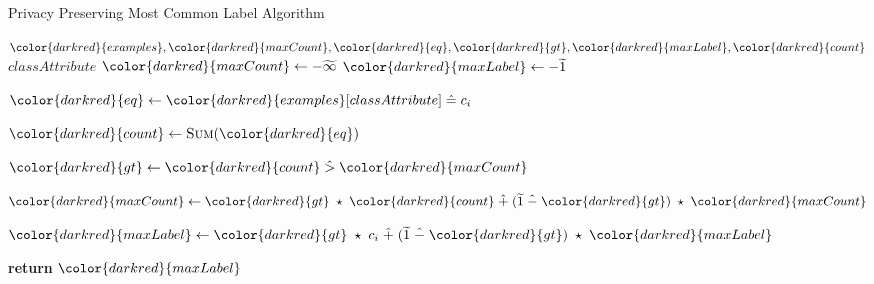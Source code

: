 \begin{algorithm}[H]
\caption{Privacy Preserving Most Common Label Algorithm}\label{a:id3-most-common-label-pp}
\begin{algorithmic}[1]
\renewcommand{\algorithmicrequire}{\textbf{Private Vars:}}
\Require ${\color{darkred}{examples}}, {\color{darkred}{maxCount}}, {\color{darkred}{eq}}, {\color{darkred}{gt}}, {\color{darkred}{maxLabel}}, {\color{darkred}{count}}$
\renewcommand{\algorithmicrequire}{\textbf{Global Vars:}}
\Require $classAttribute$
  \State ${\color{darkred}{maxCount}} \gets -\enc{\infty}$
  \State ${\color{darkred}{maxLabel}} \gets -\enc{1}$


      \State ${\color{darkred}{eq}} \gets {\color{darkred}{examples}}[classAttribute] \heq c_i$ 

      \State ${\color{darkred}{count}} \gets \textsc{Sum}({\color{darkred}{eq}})$

      \State ${\color{darkred}{gt}} \gets {\color{darkred}{count}} \hgt  {\color{darkred}{maxCount}}$

      \State ${\color{darkred}{maxCount}} \gets {\color{darkred}{gt}} \hmul {\color{darkred}{count}} \hplus (\enc{1} \hminus {\color{darkred}{gt}}) \hmul {\color{darkred}{maxCount}}$ 

      \State ${\color{darkred}{maxLabel}} \gets {\color{darkred}{gt}} \hmul c_i \hplus (\enc{1} \hminus {\color{darkred}{gt}}) \hmul {\color{darkred}{maxLabel}}$


    \EndFor

    \State \textbf{return} ${\color{darkred}{maxLabel}}$
\EndProcedure
\end{algorithmic}
\end{algorithm}
